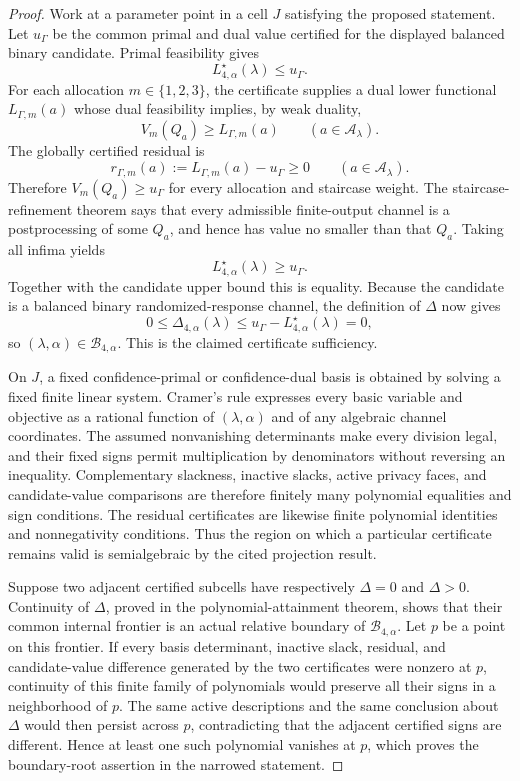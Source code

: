 \documentclass{article}
\begin{document}
\begin{proof}
Work at a parameter point in a cell \(J\) satisfying the proposed statement.  Let \(u_\Gamma\) be the common primal and dual value certified for the displayed balanced binary candidate.  Primal feasibility gives
\[
 L^\star_{4,\alpha}(\lambda)\le u_\Gamma.
\]
For each allocation \(m\in\{1,2,3\}\), the certificate supplies a dual lower functional \(L_{\Gamma,m}(a)\) whose dual feasibility implies, by weak duality,
\[
 V_m(Q_a)\ge L_{\Gamma,m}(a)
 \qquad(a\in\mathcal A_\lambda).
\]
The globally certified residual is
\[
 r_{\Gamma,m}(a):=L_{\Gamma,m}(a)-u_\Gamma\ge0
 \qquad(a\in\mathcal A_\lambda).
\]
Therefore \(V_m(Q_a)\ge u_\Gamma\) for every allocation and staircase weight.  The staircase-refinement theorem says that every admissible finite-output channel is a postprocessing of some \(Q_a\), and hence has value no smaller than that \(Q_a\).  Taking all infima yields
\[
 L^\star_{4,\alpha}(\lambda)\ge u_\Gamma.
\]
Together with the candidate upper bound this is equality.  Because the candidate is a balanced binary randomized-response channel, the definition of \(\Delta\) now gives
\[
 0\le\Delta_{4,\alpha}(\lambda)
 \le u_\Gamma-L^\star_{4,\alpha}(\lambda)=0,
\]
so \((\lambda,\alpha)\in\mathcal B_{4,\alpha}\).  This is the claimed certificate sufficiency.

On \(J\), a fixed confidence-primal or confidence-dual basis is obtained by solving a fixed finite linear system.  Cramer's rule expresses every basic variable and objective as a rational function of \((\lambda,\alpha)\) and of any algebraic channel coordinates.  The assumed nonvanishing determinants make every division legal, and their fixed signs permit multiplication by denominators without reversing an inequality.  Complementary slackness, inactive slacks, active privacy faces, and candidate-value comparisons are therefore finitely many polynomial equalities and sign conditions.  The residual certificates are likewise finite polynomial identities and nonnegativity conditions.  Thus the region on which a particular certificate remains valid is semialgebraic by the cited projection result.

Suppose two adjacent certified subcells have respectively \(\Delta=0\) and \(\Delta>0\).  Continuity of \(\Delta\), proved in the polynomial-attainment theorem, shows that their common internal frontier is an actual relative boundary of \(\mathcal B_{4,\alpha}\).  Let \(p\) be a point on this frontier.  If every basis determinant, inactive slack, residual, and candidate-value difference generated by the two certificates were nonzero at \(p\), continuity of this finite family of polynomials would preserve all their signs in a neighborhood of \(p\).  The same active descriptions and the same conclusion about \(\Delta\) would then persist across \(p\), contradicting that the adjacent certified signs are different.  Hence at least one such polynomial vanishes at \(p\), which proves the boundary-root assertion in the narrowed statement.
\end{proof}
\end{document}
